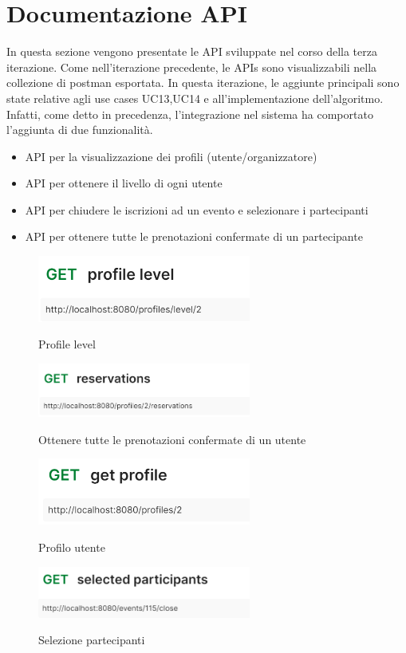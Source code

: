 \section{Documentazione API}

In questa sezione vengono presentate le API sviluppate nel corso della terza iterazione. Come nell'iterazione precedente,
le APIs sono visualizzabili nella collezione di postman esportata. In questa iterazione, le aggiunte principali sono state relative agli use cases
UC13,UC14 e all'implementazione dell'algoritmo. Infatti, come detto in precedenza, l'integrazione nel sistema ha comportato l'aggiunta di 
due funzionalità.

\begin{itemize}
    \item API per la visualizzazione dei profili (utente/organizzatore)
    \item API per ottenere il livello di ogni utente
    \item API per chiudere le iscrizioni ad un evento e selezionare i partecipanti
    \item API per ottenere tutte le prenotazioni confermate di un partecipante
\end{itemize}

\begin{figure}[h!]
    \includegraphics[width=7cm]{Iterazione 3/images/level.png}\\
    \caption{Profile level}
\end{figure}


\begin{figure}[h!]
    \includegraphics[width=7cm]{Iterazione 3/images/reservations.png}\\
    \caption{Ottenere tutte le prenotazioni confermate di un utente}
\end{figure}

\begin{figure}[h!]
    \includegraphics[width=7cm]{Iterazione 3/images/profile.png}\\
    \caption{Profilo utente}
\end{figure}

\begin{figure}[h!]
    \includegraphics[width=7cm]{Iterazione 3/images/selected participants.png}\\
    \caption{Selezione partecipanti}
\end{figure}

